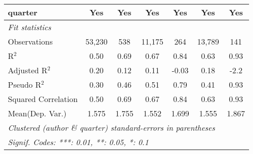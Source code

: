 \begin{tabular}{lcccccc}
   quarter                                                    & Yes            & Yes          & Yes            & Yes          & Yes          & Yes\\  
   \midrule
   \emph{Fit statistics}\\
   Observations                                               & 53,230         & 538          & 11,175         & 264          & 13,789       & 141\\  
   R$^2$                                                      & 0.50           & 0.69         & 0.67           & 0.84         & 0.63         & 0.93\\  
   Adjusted R$^2$                                             & 0.20           & 0.12         & 0.11           & -0.03        & 0.18         & -2.2\\  
   Pseudo R$^2$                                               & 0.30           & 0.46         & 0.51           & 0.79         & 0.41         & 0.93\\  
   Squared Correlation                                        & 0.50           & 0.69         & 0.67           & 0.84         & 0.63         & 0.93\\  
Mean(Dep. Var.) & 1.575 & 1.755 & 1.552 & 1.699 & 1.555 & 1.867 \\
   \midrule \midrule
   \multicolumn{7}{l}{\emph{Clustered (author \& quarter) standard-errors in parentheses}}\\
   \multicolumn{7}{l}{\emph{Signif. Codes: ***: 0.01, **: 0.05, *: 0.1}}\\
\end{tabular}
\par\endgroup
